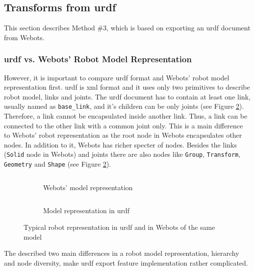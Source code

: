 \subsection{Transforms from \acs{urdf}}
This section describes Method \#3, which is based on exporting an \ac{urdf} document from Webots. 

\subsubsection{\acs{urdf} vs. Webots' Robot Model Representation}
However, it is important to compare \ac{urdf} format and Webots' robot model representation first.
\ac{urdf} is \ac{xml} format and it uses only two primitives to describe robot model, links and joints.
The \acs{urdf} document has to contain at least one link, usually named as \texttt{base\_link}, and it's children can be only joints \cite{noauthor_urdf_nodate} (see Figure \ref{fig:generalization:urdf_vs_webots:urdf}).
Therefore, a link cannot be encapsulated inside another link. Thus, a link can be connected to the other link with a common joint only.
This is a main difference to Webots' robot representation as the root node in Webots encapsulates other nodes.
In addition to it, Webots has richer specter of nodes.
Besides the links (\texttt{Solid} node in Webots) and joints there are also nodes like \texttt{Group}, \texttt{Transform}, \texttt{Geometry} and \texttt{Shape} (see Figure \ref{fig:generalization:urdf_vs_webots:urdf}).

\begin{figure}[H]
\centering
\begin{subfigure}{.5\textwidth}
  \centering
  \inputminted{c}{generalization/data/simple.proto}
  \caption{Webots' model representation}
  \label{fig:generalization:urdf_vs_webots:webots}
\end{subfigure}%
\begin{subfigure}{.5\textwidth}
  \centering
  \inputminted[fontsize=\footnotesize]{xml}{generalization/data/simple.urdf}
  \caption{Model representation in \ac{urdf}}
  \label{fig:generalization:urdf_vs_webots:urdf}
\end{subfigure}
\caption{Typical robot representation in \ac{urdf} and in Webots of the same model}
\label{fig:generalization:urdf_vs_webots}
\end{figure}

The described two main differences in a robot model representation, hierarchy and node diversity, make \ac{urdf} export feature implementation rather complicated. 


